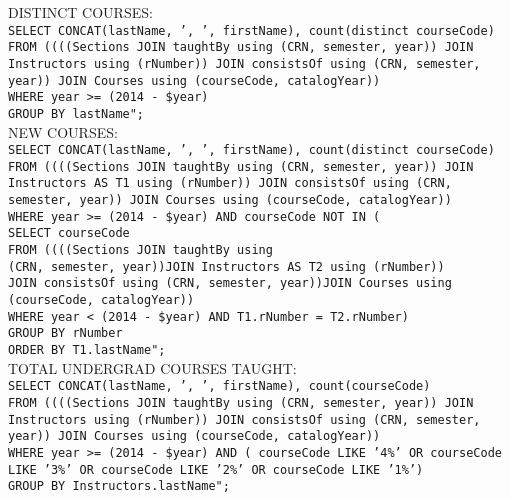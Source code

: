 \begin{enumerate}
\begin{enumerate}
					DISTINCT COURSES:\\
					\texttt{SELECT CONCAT(lastName, ', ', firstName), count(distinct courseCode)\\
						FROM ((((Sections JOIN taughtBy using (CRN, semester, year)) JOIN Instructors using (rNumber)) JOIN consistsOf using (CRN, semester, year)) JOIN Courses using (courseCode, catalogYear))\\
						WHERE year >= (2014 - \$year)\\
						GROUP BY lastName";}\\
					
					NEW COURSES:\\
					\texttt{SELECT CONCAT(lastName, ', ', firstName), count(distinct courseCode)\\
						FROM ((((Sections JOIN taughtBy using (CRN, semester, year)) JOIN Instructors AS T1 using (rNumber)) JOIN consistsOf using (CRN, semester, year)) JOIN Courses using (courseCode, catalogYear))\\
						WHERE year >= (2014 - \$year) AND courseCode NOT IN (\\
							\tab SELECT courseCode\\
							\tab FROM ((((Sections JOIN taughtBy using \\ \tab (CRN, semester, year))JOIN Instructors AS T2 using (rNumber)) \\ \tab JOIN consistsOf using (CRN, semester, year))JOIN Courses using \\ \tab (courseCode, catalogYear))\\
						WHERE year < (2014 - \$year) AND T1.rNumber = T2.rNumber)\\
						GROUP BY rNumber\\
						ORDER BY T1.lastName";}\\
						
					TOTAL UNDERGRAD COURSES TAUGHT:\\
        			\texttt{SELECT CONCAT(lastName, ', ', firstName), count(courseCode)\\
							FROM ((((Sections JOIN taughtBy using (CRN, semester, year)) JOIN Instructors using (rNumber)) JOIN consistsOf using (CRN, semester, year)) JOIN Courses using (courseCode, catalogYear))\\
							WHERE year >= (2014 - \$year) AND ( courseCode LIKE '4\%' OR courseCode LIKE '3\%' OR courseCode LIKE '2\%' OR courseCode LIKE '1\%')\\
							GROUP BY Instructors.lastName";}\\
							

\end{enumerate}
\end{enumerate}
